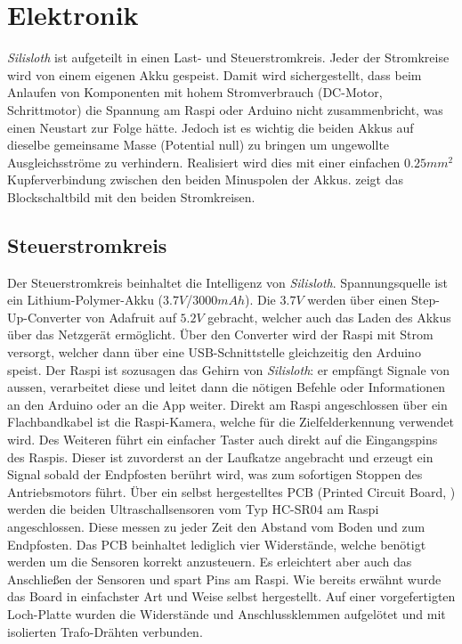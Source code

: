 \section{Elektronik}
\label{sec:elektronik}

\textit{Silisloth} ist aufgeteilt in einen Last- und Steuerstromkreis. Jeder der Stromkreise wird von einem eigenen Akku gespeist. Damit wird sichergestellt, dass beim Anlaufen von Komponenten mit hohem Stromverbrauch (DC-Motor, Schrittmotor) die Spannung am Raspi oder Arduino nicht zusammenbricht, was einen Neustart zur Folge hätte. Jedoch ist es wichtig die beiden Akkus auf dieselbe gemeinsame Masse (Potential null) zu bringen um ungewollte Ausgleichsströme zu verhindern. Realisiert wird dies mit einer einfachen $0.25mm^2$ Kupferverbindung zwischen den beiden Minuspolen der Akkus.  zeigt das Blockschaltbild mit den beiden Stromkreisen.

\subsection{Steuerstromkreis}

Der Steuerstromkreis beinhaltet die Intelligenz von \textit{Silisloth}. Spannungsquelle ist ein Lithium-Polymer-Akku ($3.7V$/$3000 mAh$). Die $3.7V$ werden über einen Step-Up-Converter von Adafruit auf $5.2V$ gebracht, welcher auch das Laden des Akkus über das Netzgerät ermöglicht. Über den Converter wird der Raspi mit Strom versorgt, welcher dann über eine USB-Schnittstelle gleichzeitig den Arduino speist. Der Raspi ist sozusagen das Gehirn von \textit{Silisloth}: er empfängt Signale von aussen, verarbeitet diese und leitet dann die nötigen Befehle oder Informationen an den Arduino oder an die App weiter. Direkt am Raspi angeschlossen über ein Flachbandkabel ist die Raspi-Kamera, welche für die Zielfelderkennung verwendet wird. Des Weiteren führt ein einfacher Taster auch direkt auf die Eingangspins des Raspis. Dieser ist zuvorderst an der Laufkatze angebracht und erzeugt ein Signal sobald der Endpfosten berührt wird, was zum sofortigen Stoppen des Antriebsmotors führt.
Über ein selbst hergestelltes PCB (Printed Circuit Board, ) werden die beiden Ultraschallsensoren vom Typ HC-SR04 am Raspi angeschlossen. Diese messen zu jeder Zeit den Abstand vom Boden und zum Endpfosten. Das PCB beinhaltet lediglich vier Widerstände, welche benötigt werden um die Sensoren korrekt anzusteuern. Es erleichtert aber auch das Anschließen der Sensoren und spart Pins am Raspi. Wie bereits erwähnt wurde das Board in einfachster Art und Weise selbst hergestellt. Auf einer vorgefertigten Loch-Platte wurden die Widerstände und Anschlussklemmen aufgelötet und mit isolierten Trafo-Drähten verbunden.


